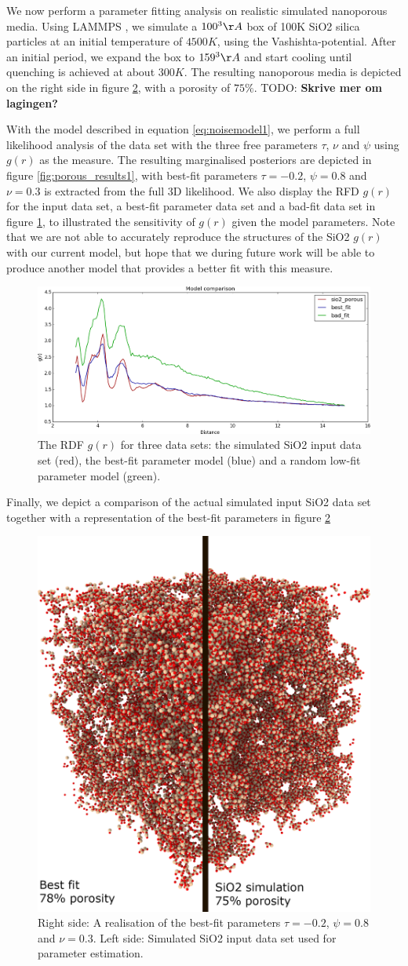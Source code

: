 \documentclass[aps,pre,twocolumn,letterpaper,floatfix,showpacs]{revtex4}
\newcommand{\todo}[1]{ {\color{Magenta} TODO: \color{Blue} \textbf{#1} }}
\begin{document}
We now perform a parameter fitting analysis on realistic simulated nanoporous media. Using LAMMPS \cite{plimpton1995fast}, we simulate a $100^3\AA$  box of 100K SiO2 silica particles at an initial temperature of $4500 K$, using the Vashishta-potential. After an initial period, we expand the box to $159^3 \AA$ and start cooling until quenching is achieved at about $300K$. The resulting nanoporous media is depicted on the right side in figure \ref{fig:porous_vs_model}, with a porosity of $75\%$. \todo{Skrive mer om lagingen?}

With the model described in equation \ref{eq:noisemodel1}, we perform a full likelihood analysis of the data set with the three free parameters $\tau$, $\nu$ and $\psi$ using $g(r)$ as the measure. The resulting marginalised posteriors are depicted in figure \ref{fig:porous_results1}, with best-fit parameters $\tau=-0.2$, $\psi=0.8$ and $\nu=0.3$ is extracted from the full 3D likelihood. We also display the RFD $g(r)$ for the input data set, a best-fit parameter data set and a bad-fit data set in figure \ref{fig:gofr1}, to illustrated the sensitivity of $g(r)$ given the model parameters. Note that we are not able to accurately reproduce the structures of the SiO2 $g(r)$ with our current model, but hope that we during future work will be able to produce another model that provides a better fit with this measure. 

\begin{figure}
\includegraphics[width=.45\textwidth]{gofr_plot.png}
\caption{The RDF $g(r)$ for three data sets: the simulated SiO2 input data set (red), the best-fit parameter model (blue) and a random low-fit parameter model (green). }
\label{fig:gofr1}
\end{figure}
Finally, we depict a comparison of the actual simulated input SiO2 data set together with a representation of the best-fit parameters in figure \ref{fig:porous_vs_model}   
\begin{figure}
\includegraphics[width=.45\textwidth]{comparison.png}
\caption{Right side: A realisation of the best-fit parameters $\tau=-0.2$, $\psi=0.8$ and $\nu=0.3$. Left side: Simulated SiO2 input data set used for parameter estimation. }
\label{fig:porous_vs_model}
\end{figure}
\end{document}
